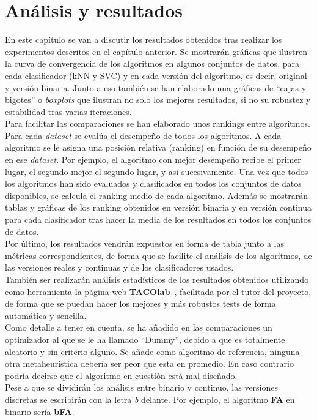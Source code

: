 \chapter{Análisis y resultados}
En este capítulo se van a discutir los resultados obtenidos tras realizar los experimentos descritos en el capítulo anterior. Se mostrarán gráficas que ilustren la curva de convergencia de los algoritmos en algunos conjuntos de datos, para cada clasificador (kNN y SVC) y en cada versión del algoritmo, es decir, original y versión binaria. Junto a eso también se han elaborado una gráficas de ``cajas y bigotes'' o \textit{boxplots} que ilustran no solo los mejores resultados, si no su robustez y estabilidad tras varias iteraciones. \\[6pt]
Para facilitar las comparaciones se han elaborado unos rankings entre algoritmos. Para cada \textit{dataset} se evalúa el desempeño de todos los algoritmos. A cada algoritmo se le asigna una posición relativa (ranking) en función de su desempeño en ese \textit{dataset}. Por ejemplo, el algoritmo con mejor desempeño recibe el primer lugar, el segundo mejor el segundo lugar, y así sucesivamente. Una vez que todos los algoritmos han sido evaluados y clasificados en todos los conjuntos de datos disponibles, se calcula el ranking medio de cada algoritmo.
Además se mostrarán tablas y gráficas de los ranking obtenidos en versión binaria y en versión continua para cada clasificador tras hacer la media de los resultados en todos los conjuntos de datos.\\[6pt]
Por último, los resultados vendrán expuestos en forma de tabla junto a las métricas correspondientes, de forma que se facilite el análisis de los algoritmos, de las versiones reales y continuas y de los clasificadores usados.\\[6pt]
También ser realizarán análisis estadísticos de los resultados obtenidos utilizando como herramienta la página web \textbf{TACOlab}~\cite{taco_website}, facilitada por el tutor del proyecto, de forma que se puedan hacer los mejores y más robustos tests de forma automática y sencilla.\\[6pt]
Como detalle a tener en cuenta, se ha añadido en las comparaciones un optimizador al que se le ha llamado ``Dummy'', debido a que es totalmente aleatorio y sin criterio alguno. Se añade como algoritmo de referencia, ninguna otra metaheurística debería ser peor que esta en promedio. En caso contrario podría decirse que el algoritmo en cuestión está mal diseñado.\\[6pt]
Pese a que se dividirán los análisis entre binario y continuo, las versiones discretas se escribirán con la letra \textit{b} delante. Por ejemplo, el algoritmo \textbf{FA} en binario sería \textbf{bFA}.

